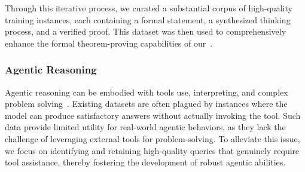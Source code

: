 

Through this iterative process, we curated a substantial corpus of high-quality training instances, each containing a formal statement, a synthesized thinking process, and a verified proof. 
This dataset was then used to comprehensively enhance the formal theorem-proving capabilities of our~{\longcatthink}.



\subsubsection{Agentic Reasoning}


Agentic reasoning can be embodied with tools use, interpreting, and complex problem solving~\citep{zeng2025glm, openai_o1}.
Existing datasets are often plagued by instances where the model can produce satisfactory answers without actually invoking the tool. 
Such data provide limited utility for real-world agentic behaviors, as they lack the challenge of leveraging external tools for problem-solving.
To alleviate this issue, we focus on identifying and retaining high-quality queries that genuinely require tool assistance, thereby fostering the development of robust agentic abilities. 


